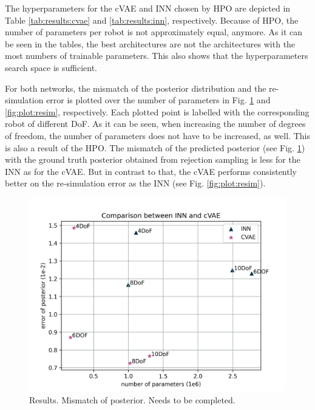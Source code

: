 \documentclass[conference]{IEEEtran}
\begin{document}
The hyperparameters for the cVAE and INN chosen by HPO are depicted in Table \ref{tab:results:cvae} and \ref{tab:results:inn}, respectively. Because of HPO, the number of parameters per robot is not approximately equal, anymore. As it can be seen in the tables, the best architectures are not the architectures with the most numbers of trainable parameters. This also shows that the hyperparameters search space is sufficient. 

For both networks, the mismatch of the posterior distribution and the re-simulation error is plotted over the number of parameters in Fig. \ref{fig:plot:posterior} and \ref{fig:plot:resim}, respectively. Each plotted point is labelled with the corresponding robot of different DoF. As it can be seen, when increasing the number of degrees of freedom, the number of parameters does not have to be increased, as well. This is also a result of the HPO. 
The mismatch of the predicted posterior (see Fig. \ref{fig:plot:posterior}) with the ground truth posterior obtained from rejection sampling is less for the INN as for the cVAE. But in contrast to that, the cVAE performs consistently better on the re-simulation error as the INN (see Fig. \ref{fig:plot:resim}).

\begin{figure}[!ht]
\centering
	\includegraphics[width=\linewidth]{figures/comparison_e_posterior_alternative.png}
    \caption{\label{fig:plot:posterior} Results. Mismatch of posterior. Needs to be completed.}
\end{figure}
\end{document}
